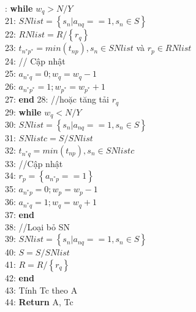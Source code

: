 \documentclass[hidelinks, 11pt, a4paper]{report}
\newenvironment{codeb}{\code}{\par}
\begin{document}
\begin{codeb}
    20: \hspace{2mm}\textbf{while} $w_q > N/Y$\\
    21: \hspace{4mm}$SNlist = \left\{s_n | a_{nq} == 1, s_n \in S\right\}$\\
    22: \hspace{4mm}$RNlist = R/\left\{r_q\right\}$\\
    23: \hspace{4mm}$t_{n^*p^*} = min(t_{np}), s_n \in SNlist$ và $r_p\in RNlist$\\
    24: \hspace{4mm}// Cập nhật\\
    25: \hspace{4mm}$a_{n^*q} = 0; w_q = w_q - 1$\\
    26: \hspace{4mm}$a_{n^*p^*} = 1; w_{p^*} = w_{p^*} + 1$\\
    27: \hspace{2mm}\textbf{end}
    28: \hspace{2mm}//hoặc tăng tải $r_q$\\
    29: \hspace{2mm}\textbf{while} $w_q < N/Y$\\
    30: \hspace{4mm}$SNlist = \left\{s_n | a_{nq} == 1, s_n \in S\right\}$\\
    31: \hspace{4mm}$SNlistc = S/SNlist$\\
    32: \hspace{4mm}$t_{n^*q} = min(t_{np}), s_n \in SNlistc$\\
    33: \hspace{4mm}//Cập nhật\\
    34: \hspace{4mm}$r_p = \left\{a_{n^*p} == 1\right\}$\\
    35: \hspace{4mm}$a_{n^*p} = 0; w_p = w_p - 1$\\
    36: \hspace{4mm}$a_{n^*q} = 1; w_{q} = w_{q} + 1$\\
    37: \hspace{2mm}\textbf{end}\\
    38: \hspace{2mm}//Loại bỏ SN\\
    39: \hspace{2mm}$SNlist = \left\{s_n | a_{nq} == 1, s_n \in S\right\}$\\
    40: \hspace{2mm}$S = S/SNlist$\\
    41: \hspace{2mm}$R = R/\left\{r_q\right\}$\\
    42: \textbf{end}\\
    43: Tính Tc theo A\\
    44: \textbf{Return} A, Tc
\end{codeb}
\end{document}
